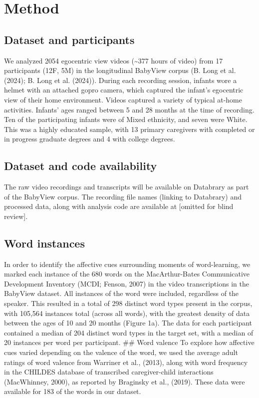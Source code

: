 \documentclass[10pt, letterpaper]{article}
\begin{document}
\section{Method}\label{method}

\subsection{Dataset and participants}\label{dataset-and-participants}

We analyzed 2054 egocentric view videos (\textasciitilde377 hours of
video) from 17 participants (12F, 5M) in the longitudinal BabyView
corpus (B. Long et al. (2024); B. Long et al. (2024)). During each
recording session, infants wore a helmet with an attached gopro camera,
which captured the infant's egocentric view of their home environment.
Videos captured a variety of typical at-home activities. Infants' ages
ranged between 5 and 28 months at the time of recording. Ten of the
participating infants were of Mixed ethnicity, and seven were White.
This was a highly educated sample, with 13 primary caregivers with
completed or in progress graduate degrees and 4 with college degrees.

\subsection{Dataset and code
availability}\label{dataset-and-code-availability}

The raw video recordings and transcripts will be available on Databrary
as part of the BabyView corpus. The recording file names (linking to
Databrary) and processed data, along with analysis code are available at
{[}omitted for blind review{]}.

\subsection{Word instances}\label{word-instances}

In order to identify the affective cues surrounding moments of
word-learning, we marked each instance of the 680 words on the
MacArthur-Bates Communicative Development Inventory (MCDI; Fenson, 2007)
in the video transcriptions in the BabyView dataset. All instances of
the word were included, regardless of the speaker. This resulted in a
total of 298 distinct word types present in the corpus, with 105,564
instances total (across all words), with the greatest density of data
between the ages of 10 and 20 months (Figure 1a). The data for each
participant contained a median of 204 distinct word types in the target
set, with a median of 20 instances per word per participant. \#\# Word
valence To explore how affective cues varied depending on the valence of
the word, we used the average adult ratings of word valence from
Warriner et al., (2013), along with word frequency in the CHILDES
database of transcribed caregiver-child interactions (MacWhinney, 2000),
as reported by Braginsky et al., (2019). These data were available for
183 of the words in our dataset.
\end{document}
